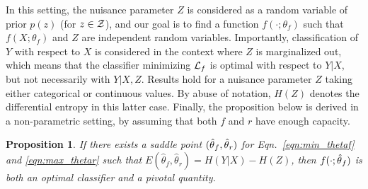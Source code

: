 \documentclass[twocolumn,superscriptaddress,aps]{revtex4-1}
\theoremstyle{plain}
\newtheorem{proposition}[theorem]{Proposition}
\begin{document}
In this setting, the nuisance parameter $Z$ is considered as a random variable
of prior $p(z)$ (for $z \in {\cal Z}$), and our goal is to find a function
$f(\cdot;\theta_f)$ such that $f(X;\theta_f)$ and $Z$ are independent random
variables.   Importantly, classification of $Y$ with respect to $X$ is
considered in the context where $Z$ is marginalized out, which means that the
classifier minimizing ${\cal L}_f$ is optimal with respect to $Y|X$, but not
necessarily with $Y|X,Z$. Results hold for a nuisance parameter $Z$ taking
either categorical or continuous values. By
abuse of notation, $H(Z)$ denotes the differential entropy in this latter case.
Finally, the  proposition below is derived in a non-parametric setting, by
assuming that both $f$ and $r$ have enough capacity.

\begin{proposition}\label{prop:2}
If there exists a saddle point $(\smash{\hat\theta}_f, \smash{\hat\theta}_r)$
for Eqn.~\ref{eqn:min_thetaf} and \ref{eqn:max_thetar} such that
$E(\hat\theta_f, \hat\theta_r) = H({Y|X}) - H(Z)$, then
$f(\cdot;\smash{\hat\theta}_f)$ is both an optimal classifier and a pivotal
quantity.
\end{proposition}
\end{document}
